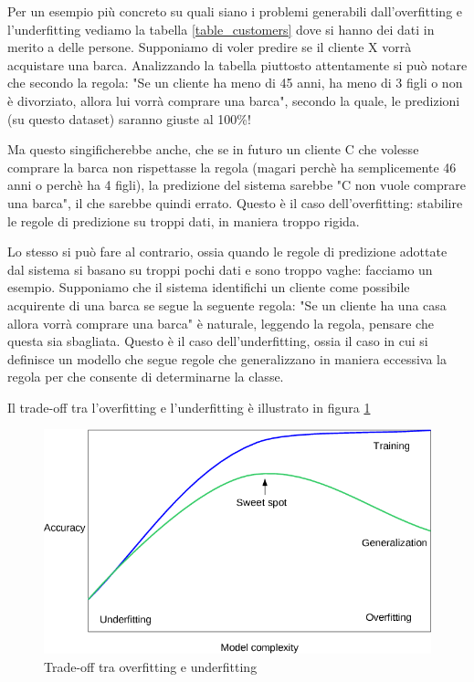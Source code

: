 \documentclass[12pt,italian]{report}
\begin{document}
Per un esempio più concreto su quali siano i problemi generabili dall'overfitting e l'underfitting vediamo la tabella \ref{table_customers} dove si hanno dei dati in merito a delle persone. Supponiamo di voler predire se il cliente X vorrà acquistare una barca. Analizzando la tabella piuttosto attentamente si può notare che secondo la regola: "Se un cliente ha meno di 45 anni, ha meno di 3 figli o non è divorziato, allora lui vorrà comprare una barca", secondo la quale, le predizioni (su questo dataset) saranno giuste al 100\%! 

Ma questo singificherebbe anche, che se in futuro un cliente C che volesse comprare la barca non rispettasse la regola (magari perchè ha semplicemente 46 anni o perchè ha 4 figli), la predizione del sistema sarebbe "C non vuole comprare una barca", il che sarebbe quindi errato. Questo è il caso dell'overfitting: stabilire le regole di predizione su troppi dati, in maniera troppo rigida.

Lo stesso si può fare al contrario, ossia quando le regole di predizione adottate dal sistema si basano su troppi pochi dati e sono troppo vaghe: facciamo un esempio.
Supponiamo che il sistema identifichi un cliente come possibile acquirente di una barca se segue la seguente regola: "Se un cliente ha una casa allora vorrà comprare una barca" è naturale, leggendo la regola, pensare che questa sia sbagliata. Questo è il caso dell'underfitting, ossia il caso in cui si definisce un modello che segue regole che generalizzano in maniera eccessiva la regola per che consente di determinarne la classe.


Il trade-off tra l'overfitting e l'underfitting è illustrato in figura \ref{tradeoff_img}

\begin{figure}

	\label{tradeoff_img}
	\includegraphics[scale=0.5]{../img/tradeoff_overfitting_underfitting.png}
	\caption{Trade-off tra overfitting e underfitting}
\end{figure}
\end{document}
